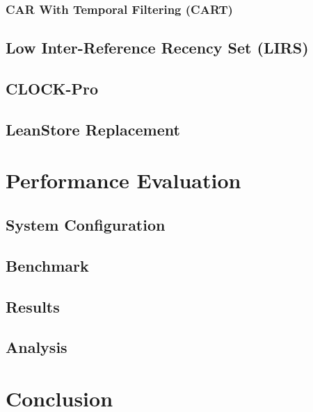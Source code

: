 \subsubsection[CART]{CAR With Temporal Filtering (CART)} \label{subsubsec:cart}

\subsection[LIRS]{Low Inter-Reference Recency Set (LIRS)} \label{subsec:lirs}

\subsection{CLOCK-Pro} \label{subsec:clock-pro}

\subsection[LeanStore]{LeanStore Replacement} \label{subsec:leanstore}

\section[Performance Evaluation]{Performance Evaluation} \label{sec:page_evictioners_performance_evaluation}

\subsection[System Configuration]{System Configuration} \label{subsec:page_evictioners_system_configuration}

\subsection[Benchmark]{Benchmark} \label{subsec:page_evictioners_benchmark}

\subsection[Results]{Results} \label{subsec:page_evictioners_results}

\subsection[Analysis]{Analysis} \label{subsec:page_evictioners_analysis}

\section{Conclusion} \label{sec:page_evictioners_outro}
